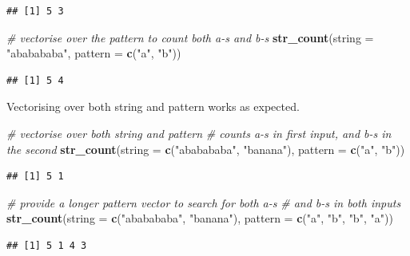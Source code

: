 \documentclass[]{book}
\newenvironment{Shaded}{}{}
\newcommand{\CommentTok}[1]{\textcolor[rgb]{0.38,0.63,0.69}{\textit{#1}}}
\newcommand{\DataTypeTok}[1]{\textcolor[rgb]{0.56,0.13,0.00}{#1}}
\newcommand{\KeywordTok}[1]{\textcolor[rgb]{0.00,0.44,0.13}{\textbf{#1}}}
\newcommand{\NormalTok}[1]{#1}
\newcommand{\StringTok}[1]{\textcolor[rgb]{0.25,0.44,0.63}{#1}}
\begin{document}
\begin{verbatim}
## [1] 5 3
\end{verbatim}

\begin{Shaded}
\begin{Highlighting}[]
\CommentTok{# vectorise over the pattern to count both a-s and b-s}
\KeywordTok{str_count}\NormalTok{(}\DataTypeTok{string =} \StringTok{"ababababa"}\NormalTok{, }\DataTypeTok{pattern =} \KeywordTok{c}\NormalTok{(}\StringTok{"a"}\NormalTok{, }\StringTok{"b"}\NormalTok{))}
\end{Highlighting}
\end{Shaded}

\begin{verbatim}
## [1] 5 4
\end{verbatim}

Vectorising over both string and pattern works as expected.

\begin{Shaded}
\begin{Highlighting}[]
\CommentTok{# vectorise over both string and pattern}
\CommentTok{# counts a-s in first input, and b-s in the second}
\KeywordTok{str_count}\NormalTok{(}\DataTypeTok{string =} \KeywordTok{c}\NormalTok{(}\StringTok{"ababababa"}\NormalTok{, }\StringTok{"banana"}\NormalTok{),}
          \DataTypeTok{pattern =} \KeywordTok{c}\NormalTok{(}\StringTok{"a"}\NormalTok{, }\StringTok{"b"}\NormalTok{))}
\end{Highlighting}
\end{Shaded}

\begin{verbatim}
## [1] 5 1
\end{verbatim}

\begin{Shaded}
\begin{Highlighting}[]
\CommentTok{# provide a longer pattern vector to search for both a-s}
\CommentTok{# and b-s in both inputs}
\KeywordTok{str_count}\NormalTok{(}\DataTypeTok{string =} \KeywordTok{c}\NormalTok{(}\StringTok{"ababababa"}\NormalTok{, }\StringTok{"banana"}\NormalTok{),}
          \DataTypeTok{pattern =} \KeywordTok{c}\NormalTok{(}\StringTok{"a"}\NormalTok{, }\StringTok{"b"}\NormalTok{,}
                      \StringTok{"b"}\NormalTok{, }\StringTok{"a"}\NormalTok{))}
\end{Highlighting}
\end{Shaded}

\begin{verbatim}
## [1] 5 1 4 3
\end{verbatim}
\end{document}
